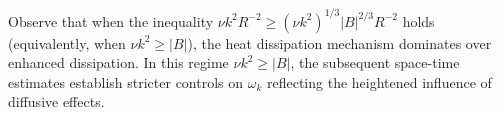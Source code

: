 \documentclass[final, 12pt,reqno]{amsart}
\newtheorem{proposition}[theorem]{\bf Proposition}
\numberwithin{equation}{section}
\begin{document}
Observe that when the inequality $\nu k^2R^{-2} \geq( \nu k^2)^{1/3}|B|^{2/3}R^{-2}$ holds (equivalently, when $\nu k^2 \geq  |B|$), the heat dissipation mechanism dominates over enhanced dissipation. In this regime $\nu k^2 \geq  |B|$, the subsequent space-time estimates establish stricter controls on $\omega_k$ reflecting the heightened influence of diffusive effects.
\end{document}
